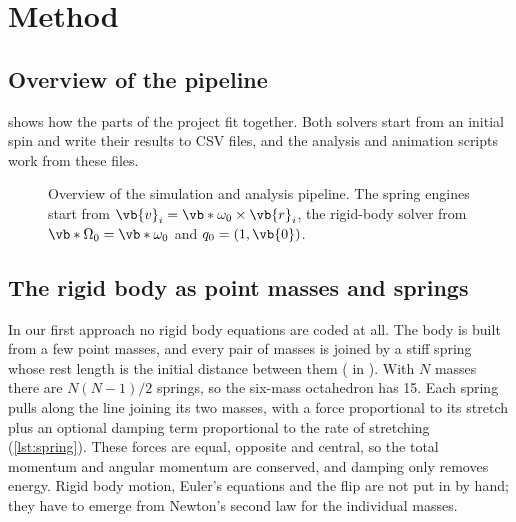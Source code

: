 \makeatletter\if@firstcolumn\null\newpage\fi\makeatother\newpage %
\section{Method}
\label{sec:methods}

\subsection{Overview of the pipeline}
 shows how the parts of the project fit together.
Both solvers start from an initial spin and write their results to CSV files, and the analysis and animation scripts work from these files.
\begin{figure}[htb]
    \centering
    \caption{Overview of the simulation and analysis pipeline. The spring engines start from $\vb{v}_i=\vb*{\omega}_0\times\vb{r}_i$, the rigid-body solver from $\vb*{\Omega}_0=\vb*{\omega}_0$ and $q_0=(1,\vb{0})$.}
    \label{fig:pipeline}
\end{figure}

\subsection{The rigid body as point masses and springs}
\label{sec:spring-model}
In our first approach no rigid body equations are coded at all.
The body is built from a few point masses, and every pair of masses is joined by a stiff spring whose rest length is the initial distance between them ( in ).
With $N$ masses there are $N(N-1)/2$ springs, so the six-mass octahedron has 15.
Each spring pulls along the line joining its two masses, with a force proportional to its stretch plus an optional damping term proportional to the rate of stretching (\cref{lst:spring}).
These forces are equal, opposite and central, so the total momentum and angular momentum are conserved, and damping only removes energy.
Rigid body motion, Euler's equations and the flip are not put in by hand; they have to emerge from Newton's second law for the individual masses.

